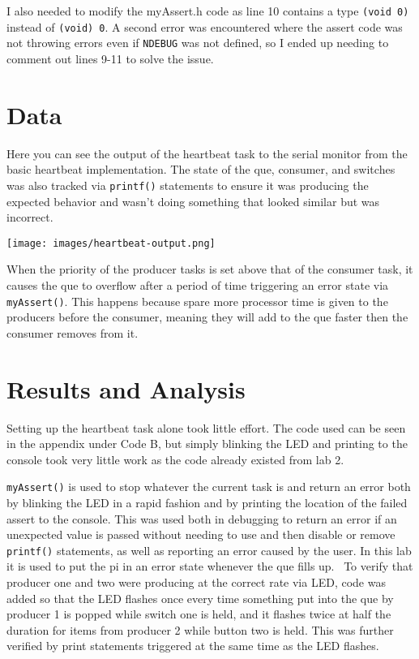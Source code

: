 \documentclass[sigconf]{article}
\begin{document}
I also needed to modify the myAssert.h code as line 10 contains a type \lstinline{(void 0)} instead of \lstinline{(void) 0}. A second error was encountered where the assert code was not throwing errors even if \lstinline{NDEBUG} was not defined, so I ended up needing to comment out lines 9-11 to solve the issue.


\section*{Data}

Here you can see the output of the heartbeat task to the serial monitor from the basic heartbeat implementation. The state of the que, consumer, and switches was also tracked via \lstinline{printf()} statements to ensure it was producing the expected behavior and wasn't doing something that looked similar but was incorrect.

\texttt{[image: images/heartbeat-output.png]}

When the priority of the producer tasks is set above that of the consumer task, it causes the que to overflow after a period of time triggering an error state via \lstinline{myAssert()}. This happens because spare more processor time is given to the producers before the consumer, meaning they will add to the que faster then the consumer removes from it.


\section*{Results and Analysis}

Setting up the heartbeat task alone took little effort. The code used can be seen in the appendix under Code B, but simply blinking the LED and printing to the console took very little work as the code already existed from lab 2. \

\lstinline{myAssert()} is used to stop whatever the current task is and return an error both by blinking the LED in a rapid fashion and by printing the location of the failed assert to the console. This was used both in debugging to return an error if an unexpected value is passed without needing to use and then disable or remove \lstinline{printf()} statements, as well as reporting an error caused by the user. In this lab it is used to put the pi in an error state whenever the que fills up. \
To verify that producer one and two were producing at the correct rate via LED, code was added so that the LED flashes once every time something put into the que by producer 1 is popped while switch one is held, and it flashes twice at half the duration for items from producer 2 while button two is held. This was further verified by print statements triggered at the same time as the LED flashes. \
\end{document}
